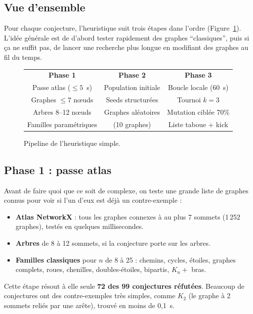 \documentclass[12pt,a4paper]{article}
\begin{document}
\subsection{Vue d'ensemble}

Pour chaque conjecture, l'heuristique suit trois étapes dans l'ordre
(Figure~\ref{fig:pipeline}).  L'idée générale est de d'abord tester rapidement
des graphes ``classiques'', puis si ça ne suffit pas, de lancer une recherche
plus longue en modifiant des graphes au fil du temps.

\begin{figure}[h]
  \centering
  \begin{tabular}{|c|c|c|}
    \hline
    \textbf{Phase 1} & \textbf{Phase 2} & \textbf{Phase 3} \\
    Passe atlas ($\leq 5$~s) & Population initiale & Boucle locale (60~s) \\
    \hline
    Graphes $\leq 7$ nœuds & Seeds structurées & Tournoi $k=3$ \\
    Arbres 8--12 nœuds & Graphes aléatoires & Mutation ciblée 70\% \\
    Familles paramétriques & (10 graphes) & Liste taboue + kick \\
    \hline
  \end{tabular}
  \caption{Pipeline de l'heuristique simple.}
  \label{fig:pipeline}
\end{figure}

\subsection{Phase 1 : passe atlas}

Avant de faire quoi que ce soit de complexe, on teste une grande liste de graphes
connus pour voir si l'un d'eux est déjà un contre-exemple :

\begin{itemize}
  \item \textbf{Atlas NetworkX} : tous les graphes connexes à au plus 7 sommets
        (1\,252 graphes), testés en quelques millisecondes.
  \item \textbf{Arbres} de 8 à 12 sommets, si la conjecture porte sur les arbres.
  \item \textbf{Familles classiques} pour $n$ de 8 à 25 : chemins, cycles, étoiles,
        graphes complets, roues, chenilles, doubles-étoiles, bipartis, $K_n +$ bras.
\end{itemize}

Cette étape résout à elle seule \textbf{72 des 99 conjectures réfutées}.
Beaucoup de conjectures ont des contre-exemples très simples, comme $K_2$
(le graphe à 2 sommets reliés par une arête), trouvé en moins de 0,1~s.
\end{document}

